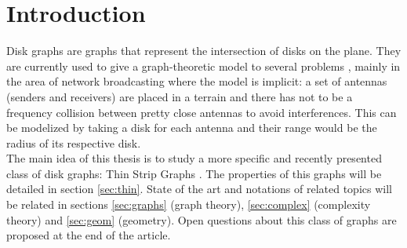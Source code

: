 \section{Introduction}

Disk graphs are graphs that represent the intersection of disks on the plane. They are
currently used to give a graph-theoretic model to several problems \cite{seiferth2016disk},
mainly in the area of network broadcasting \cite{murphey1999frequency} where the model
is implicit: a set of antennas (senders and receivers) are placed in a terrain and there
has not to be a frequency collision between pretty close antennas to avoid interferences.
This can be modelized by taking a disk for each antenna and their range would be the radius
of its respective disk.\\

The main idea of this thesis is to study a more specific and recently presented class
of disk graphs: Thin Strip Graphs \cite{hayashiThinStripGraphs2017}. The properties
of this graphs will be detailed in section \ref{sec:thin}. State of the art and notations
of related topics will be related in sections \ref{sec:graphs} (graph theory), \ref{sec:complex}
(complexity theory) and \ref{sec:geom} (geometry). Open questions about this class of graphs
are proposed at the end of the article.
